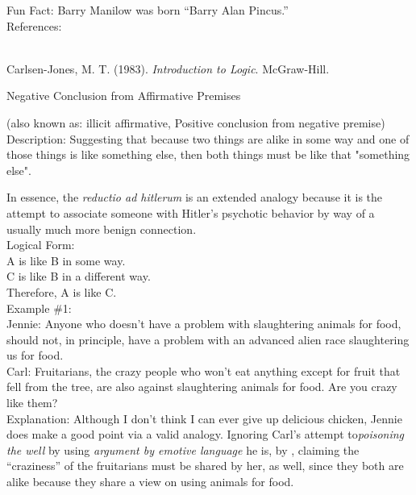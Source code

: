 \documentclass[a4paper,12pt,single,pdftex]{scrartcl}
\begin{document}
    
      Fun Fact: Barry Manilow was born “Barry Alan Pincus.”
    \\

    References:

    
      
        
      \\

      
        
          Carlsen-Jones, M. T. (1983). {\it Introduction to Logic}. McGraw-Hill.
        
      
    
  

Negative Conclusion from Affirmative Premises
    
      (also known as: illicit affirmative, Positive conclusion from negative premise)
    \\

  
    Description: Suggesting that because two things are alike in some way and one of those things is like something else, then both things must be like that "something else".

    
      In essence, the {\it reductio ad hitlerum} is an extended analogy because it is the attempt to associate someone with Hitler’s psychotic behavior by way of a usually much more benign connection.
    \\

    
      Logical Form:
    \\

    
      A is like B in some way.
    \\

    
      C is like B in a different way.
    \\

    
      Therefore, A is like C.
    \\

    
      Example \#1:
    \\

    
      Jennie: Anyone who doesn’t have a problem with slaughtering animals for food, should not, in principle, have a problem with an advanced alien race slaughtering us for food.
    \\

    
      Carl: Fruitarians, the crazy people who won’t eat anything except for fruit that fell from the tree, are also against slaughtering animals for food.  Are you crazy like them?
    \\

    
      Explanation: Although I don’t think I can ever give up delicious chicken, Jennie does make a good point via a valid analogy.  Ignoring Carl’s attempt to{\it  poisoning the well }by using {\it argument by emotive language} he is, by{\it  
}, claiming the “craziness” of the fruitarians must be shared by her, as well, since they both are alike because they share a view on using animals for food.
    \\
\end{document}
